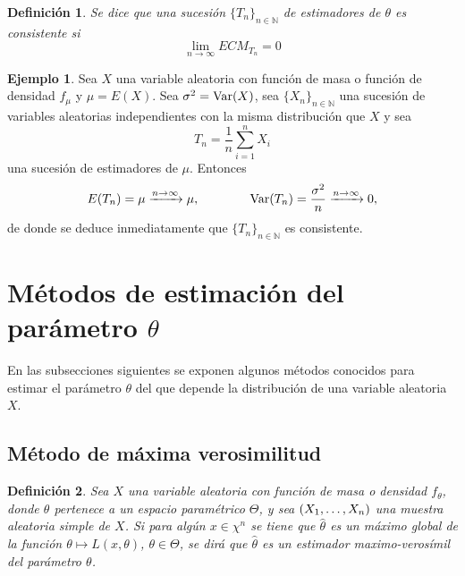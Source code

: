 \documentclass[11pt]{report}
\newtheorem{definition}{Definición}
\theoremstyle{definition}
\newtheorem{example}{Ejemplo}
\newcommand{\N}{\mathbb N}
\begin{document}
\begin{definition}
Se dice que una sucesión $\{T_n\}_{n \in \N}$ de estimadores de $\theta$ es \emph{consistente} si
\[\lim_{n \to \infty} ECM_{T_n} =0\]
\end{definition}

\begin{example}
Sea $X$ una variable aleatoria con función de masa o función de densidad $f_\mu$ y $\mu=E(X)$. Sea $\sigma^2 =\textup{Var}(X)$, sea $\{X_n\}_{n \in \N}$ una sucesión de variables aleatorias independientes con la misma distribución que $X$ y sea
\[T_n = \frac{1}{n}\sum_{i=1}^nX_i\]
una sucesión de estimadores de $\mu$. Entonces
\[E(T_n) = \mu \xrightarrow{n\to \infty} \mu, \qquad \qquad \textup{Var}(T_n) = \frac{\sigma^2}{n}\xrightarrow{n\to\infty}0,\]
de donde se deduce inmediatamente que $\{T_n\}_{n \in \N}$ es consistente.
\end{example}

\section{Métodos de estimación del parámetro \texorpdfstring{$\theta$}{TEXT}}

En las subsecciones siguientes se exponen algunos métodos conocidos para estimar el parámetro $\theta$ del que depende la distribución de una variable aleatoria $X$.

\subsection{Método de máxima verosimilitud}

\begin{definition}
Sea $X$ una variable aleatoria con función de masa o densidad $f_\theta$, donde $\theta$ pertenece a un espacio paramétrico $\Theta$, y sea $(X_1,\mathellipsis,X_n)$ una muestra aleatoria simple de $X$. Si para algún $x \in \chi^n$ se tiene que $\hat{\theta}$ es un máximo global de la función $\theta \mapsto L(x,\theta)$, $\theta \in \Theta$, se dirá que $\hat{\theta}$ es un \emph{estimador maximo-verosímil del parámetro $\theta$}.
\end{definition}
\end{document}
